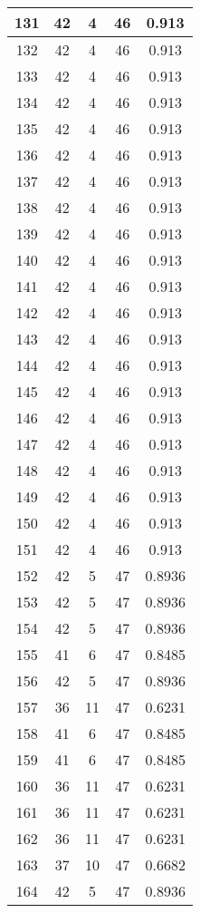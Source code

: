 \documentclass[letterpaper, 12pt]{article}
\begin{document}
\begin{longtable}{|c|c|c|c|c|}
\hline
131 & 42 & 4 & 46 & 0.913 \\
\hline
132 & 42 & 4 & 46 & 0.913 \\
\hline
133 & 42 & 4 & 46 & 0.913 \\
\hline
134 & 42 & 4 & 46 & 0.913 \\
\hline
135 & 42 & 4 & 46 & 0.913 \\
\hline
136 & 42 & 4 & 46 & 0.913 \\
\hline
137 & 42 & 4 & 46 & 0.913 \\
\hline
138 & 42 & 4 & 46 & 0.913 \\
\hline
139 & 42 & 4 & 46 & 0.913 \\
\hline
140 & 42 & 4 & 46 & 0.913 \\
\hline
141 & 42 & 4 & 46 & 0.913 \\
\hline
142 & 42 & 4 & 46 & 0.913 \\
\hline
143 & 42 & 4 & 46 & 0.913 \\
\hline
144 & 42 & 4 & 46 & 0.913 \\
\hline
145 & 42 & 4 & 46 & 0.913 \\
\hline
146 & 42 & 4 & 46 & 0.913 \\
\hline
147 & 42 & 4 & 46 & 0.913 \\
\hline
148 & 42 & 4 & 46 & 0.913 \\
\hline
149 & 42 & 4 & 46 & 0.913 \\
\hline
150 & 42 & 4 & 46 & 0.913 \\
\hline
151 & 42 & 4 & 46 & 0.913 \\
\hline
152 & 42 & 5 & 47 & 0.8936 \\
\hline
153 & 42 & 5 & 47 & 0.8936 \\
\hline
154 & 42 & 5 & 47 & 0.8936 \\
\hline
155 & 41 & 6 & 47 & 0.8485 \\
\hline
156 & 42 & 5 & 47 & 0.8936 \\
\hline
157 & 36 & 11 & 47 & 0.6231 \\
\hline
158 & 41 & 6 & 47 & 0.8485 \\
\hline
159 & 41 & 6 & 47 & 0.8485 \\
\hline
160 & 36 & 11 & 47 & 0.6231 \\
\hline
161 & 36 & 11 & 47 & 0.6231 \\
\hline
162 & 36 & 11 & 47 & 0.6231 \\
\hline
163 & 37 & 10 & 47 & 0.6682 \\
\hline
164 & 42 & 5 & 47 & 0.8936 \\

\end{longtable}
\end{document}
